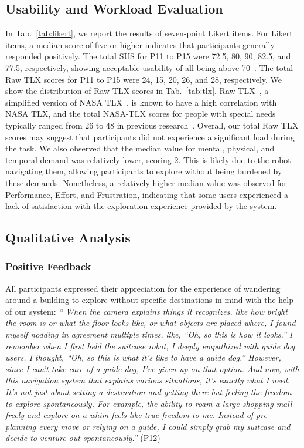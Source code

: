 \subsection{Usability and Workload Evaluation}
In Tab.~\ref{tab:likert}, we report the results of seven-point Likert items. 
For Likert items, a median score of five or higher indicates that participants generally responded positively.
The total SUS for P11 to P15 were 72.5, 80, 90, 82.5, and 77.5, respectively, showing acceptable usability of all being above 70~\cite{bangor2009determining}. 
The total Raw TLX scores for P11 to P15 were 24, 15, 20, 26, and 28, respectively. 
We show the distribution of Raw TLX scores in Tab.~\ref{tab:tlx}.
Raw TLX~\cite{byers1989traditional}, a simplified version of NASA TLX~\cite{hart2006nasa}, is known to have a high correlation with NASA TLX, and the total NASA-TLX scores for people with special needs typically ranged from 26 to 48 in previous research~\cite{hertzum2021reference}. 
Overall, our total Raw TLX scores may suggest that participants did not experience a significant load during the task.
We also observed that the median value for mental, physical, and temporal demand was relatively lower, scoring 2. 
This is likely due to the robot navigating them, allowing participants to explore without being burdened by these demands. 
Nonetheless, a relatively higher median value was observed for Performance, Effort, and Frustration, indicating that some users experienced a lack of satisfaction with the exploration experience provided by the system. 

\subsection{Qualitative Analysis}
\subsubsection{Positive Feedback}
All participants expressed their appreciation for the experience of wandering around a building to explore without specific destinations in mind with the help of our system:
\newanswer[\label{P12IWantThis}]\textit{``
When the camera explains things it recognizes, like how bright the room is or what the floor looks like, or what objects are placed where, I found myself nodding in agreement multiple times, like, ``Oh, so this is how it looks.'' 
I remember when I first held the suitcase robot, I deeply empathized with guide dog users. I thought, ``Oh, so this is what it's like to have a guide dog.'' However, since I can't take care of a guide dog, I’ve given up on that option. 
And now, with this navigation system that explains various situations, it's exactly what I need. It’s not just about setting a destination and getting there but feeling the freedom to explore spontaneously. For example, the ability to roam a large shopping mall freely and explore on a whim feels like true freedom to me. Instead of pre-planning every move or relying on a guide, I could simply grab my suitcase and decide to venture out spontaneously.''} (P12)

